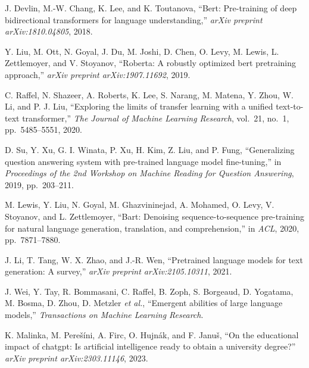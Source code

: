 \begin{enumerate}[leftmargin=2em,label={[\arabic*]}]

\item J. Devlin, M.-W. Chang, K. Lee, and K. Toutanova, ``Bert: Pre-training of deep bidirectional transformers for language understanding,'' \textit{arXiv preprint arXiv:1810.04805}, 2018.

\item Y. Liu, M. Ott, N. Goyal, J. Du, M. Joshi, D. Chen, O. Levy, M. Lewis, L. Zettlemoyer, and V. Stoyanov, ``Roberta: A robustly optimized bert pretraining approach,'' \textit{arXiv preprint arXiv:1907.11692}, 2019.

\item C. Raffel, N. Shazeer, A. Roberts, K. Lee, S. Narang, M. Matena, Y. Zhou, W. Li, and P. J. Liu, ``Exploring the limits of transfer learning with a unified text-to-text transformer,'' \textit{The Journal of Machine Learning Research}, vol.~21, no.~1, pp.~5485--5551, 2020.

\item D. Su, Y. Xu, G. I. Winata, P. Xu, H. Kim, Z. Liu, and P. Fung, ``Generalizing question answering system with pre-trained language model fine-tuning,'' in \textit{Proceedings of the 2nd Workshop on Machine Reading for Question Answering}, 2019, pp.~203--211.

\item M. Lewis, Y. Liu, N. Goyal, M. Ghazvininejad, A. Mohamed, O. Levy, V. Stoyanov, and L. Zettlemoyer, ``Bart: Denoising sequence-to-sequence pre-training for natural language generation, translation, and comprehension,'' in \textit{ACL}, 2020, pp.~7871--7880.

\item J. Li, T. Tang, W. X. Zhao, and J.-R. Wen, ``Pretrained language models for text generation: A survey,'' \textit{arXiv preprint arXiv:2105.10311}, 2021.

\item J. Wei, Y. Tay, R. Bommasani, C. Raffel, B. Zoph, S. Borgeaud, D. Yogatama, M. Bosma, D. Zhou, D. Metzler \textit{et al.}, ``Emergent abilities of large language models,'' \textit{Transactions on Machine Learning Research}.

\item K. Malinka, M. Pere\v{s}\'{i}ni, A. Firc, O. Hujn\'{a}k, and F. Janu\v{s}, ``On the educational impact of chatgpt: Is artificial intelligence ready to obtain a university degree?'' \textit{arXiv preprint arXiv:2303.11146}, 2023.


\end{enumerate}
